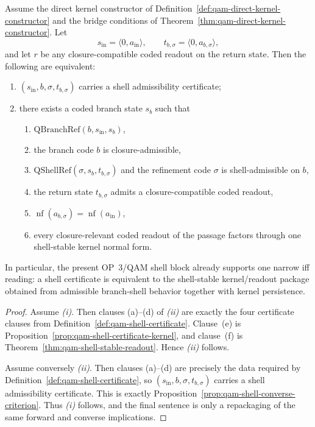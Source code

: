 \begin{theorem}\label{thm:qam-shell-iff-package}
Assume the direct kernel constructor of Definition~\ref{def:qam-direct-kernel-constructor} and the bridge conditions of Theorem~\ref{thm:qam-direct-kernel-constructor}. Let
\[
s_{\mathrm{in}}=\langle 0,a_{\mathrm{in}}\rangle,
\qquad
 t_{b,\sigma}=\langle 0,a_{b,\sigma}\rangle,
\]
and let $r$ be any closure-compatible coded readout on the return state. Then the following are equivalent:
\begin{enumerate}[leftmargin=2em,label=(\roman*)]
  \item $(s_{\mathrm{in}},b,\sigma,t_{b,\sigma})$ carries a shell admissibility certificate;
  \item there exists a coded branch state $s_b$ such that
  \begin{enumerate}[leftmargin=2em,label=(\alph*)]
    \item $\mathrm{QBranchRef}(b,s_{\mathrm{in}},s_b)$,
    \item the branch code $b$ is closure-admissible,
    \item $\mathrm{QShellRef}(\sigma,s_b,t_{b,\sigma})$ and the refinement code $\sigma$ is shell-admissible on $b$,
    \item the return state $t_{b,\sigma}$ admits a closure-compatible coded readout,
    \item $\operatorname{nf}(a_{b,\sigma})=\operatorname{nf}(a_{\mathrm{in}})$,
    \item every closure-relevant coded readout of the passage factors through one shell-stable kernel normal form.
  \end{enumerate}
\end{enumerate}
In particular, the present OP~3/QAM shell block already supports one narrow iff reading: a shell certificate is equivalent to the shell-stable kernel/readout package obtained from admissible branch-shell behavior together with kernel persistence.
\end{theorem}

\begin{proof}
Assume \emph{(i)}. Then clauses (a)--(d) of \emph{(ii)} are exactly the four certificate clauses from Definition~\ref{def:qam-shell-certificate}. Clause~(e) is Proposition~\ref{prop:qam-shell-certificate-kernel}, and clause~(f) is Theorem~\ref{thm:qam-shell-stable-readout}. Hence \emph{(ii)} follows.

Assume conversely \emph{(ii)}. Then clauses (a)--(d) are precisely the data required by Definition~\ref{def:qam-shell-certificate}, so $(s_{\mathrm{in}},b,\sigma,t_{b,\sigma})$ carries a shell admissibility certificate. This is exactly Proposition~\ref{prop:qam-shell-converse-criterion}. Thus \emph{(i)} follows, and the final sentence is only a repackaging of the same forward and converse implications.
\end{proof}


